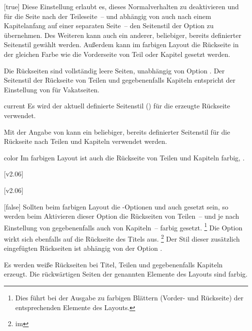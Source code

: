 \begin{Declaration*}{}
\begin{Declaration*}{}
\begin{Declaration*}{}
\begin{Declaration}{}[true]
Diese Einstellung erlaubt es, dieses Normalverhalten zu deaktivieren und für 
die Seite nach der Teileseite~-- und abhängig von  
auch nach einem Kapitelanfang auf einer separaten Seite~-- den Seitenstil der 
Option  zu übernehmen. Des Weiteren kann auch ein 
anderer, beliebiger, bereits definierter Seitenstil gewählt werden. Außerdem
kann im farbigen Layout die Rückseite in der gleichen Farbe wie die 
Vorderseite von Teil oder Kapitel gesetzt werden. \notudscrartcl
%
\begin{values}{}
\itemfalse
  Die Rückseiten sind vollständig leere Seiten, unabhängig von Option
  .
\itemtrue*
  Der Seitenstil der Rückseite von Teilen und gegebenenfalls Kapiteln 
  entspricht der Einstellung von  für Vakatseiten.
\item[current]
  Es wird der aktuell definierte Seitenstil () für die 
  erzeugte Rückseite verwendet.
\item[\PValueName{Seitenstil}]
  Mit der Angabe von  
  kann ein beliebiger, bereits definierter Seitenstil für die Rückseite nach 
  Teilen und Kapiteln verwendet werden.
\item[color]
  Im farbigen Layout ist auch die Rückseite von Teilen und Kapiteln farbig, 
  .
\end{values}
[v2.06]
\end{Declaration}

[v2.06]
\begin{Declaration}{}[false]%
\printdeclarationlist%
%
%
%
%
%
Sollten beim farbigen Layout die \KOMAScript-Optionen  und 
auch  gesetzt sein, so werden beim Aktivieren dieser Option 
die Rückseiten von Teilen~-- und je nach Einstellung von  
gegebenenfalls auch von Kapiteln~-- farbig gesetzt.%
\footnote{%
  Dies führt bei der Ausgabe zu farbigen Blättern (Vorder- und Rückseite) der 
  entsprechenden Elemente des Layouts.
}
Die Option wirkt sich ebenfalls auf die Rückseite des Titels aus.%
\footnote{%
   im \scrguide*
}
Der Stil dieser zusätzlich eingefügten Rückseiten ist abhängig von der Option
.
%
\begin{values}{}
\itemfalse
  Es werden weiße Rückseiten bei Titel, Teilen und gegebenenfalls Kapiteln 
  erzeugt.
\itemtrue*
  Die rückwärtigen Seiten der genannten Elemente des Layouts sind farbig.
\end{values}
%
\end{Declaration}




\end{Declaration*}
\end{Declaration*}
\end{Declaration*}
